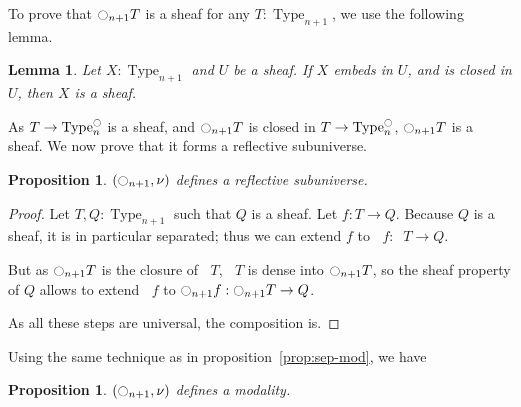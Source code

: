 \documentclass[conference]{IEEEtran}
\newtheorem{prop}[thm]{Proposition}
\newtheorem{lem}[thm]{Lemma}
\DeclareMathOperator{\Type}{Type}
\newcommand{\modal}{\ensuremath{\ocircle}}
\newcommand \separated {\mathop{\square_{n+1}} }
\begin{document}
To prove that $\modal_{n+1} T$ is a sheaf for any $T:\Type_{n+1}$, we
use the following lemma.
\begin{lem}
  Let $X:\Type_{n+1}$ and $U$ be a sheaf. If $X$ embeds
  in $U$, and is closed in $U$, then $X$ is a sheaf.
\end{lem}

As $T\to \Type_n^\modal$ is a sheaf, and $\modal_{n+1}T$ is closed in
$T\to \Type_n^\modal$, $\modal_{n+1}T$ is a sheaf. We now prove that
it forms a reflective subuniverse.

\begin{prop}
  $(\modal_{n+1},\nu)$ defines a reflective subuniverse.
\end{prop}
\begin{proof}
  Let $T,Q:\Type_{n+1}$ such that $Q$ is a sheaf. Let $f:T\to Q$.
  Because $Q$ is a sheaf, it is in particular separated;
  thus we can extend $f$ to $\separated f:\separated T\to Q$.

  But as $\modal_{n+1} T$ is the closure of $\separated T$, $\separated T$ is dense
  into $\modal_{n+1} T$, so the sheaf property of $Q$ allows to extend
  $\separated f$ to $\modal_{n+1} f:\modal_{n+1} T \to Q$.

  As all these steps are universal, the composition is.
\end{proof}

Using the same technique as in proposition~\ref{prop:sep-mod}, we have
\begin{prop}
  $(\modal_{n+1},\nu)$ defines a modality.
\end{prop}
\end{document}
